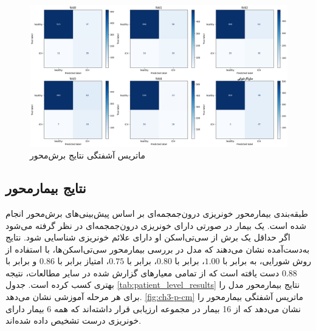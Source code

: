 \begin{figure}[h]
\centering
\includegraphics[width=1.0\linewidth]{Images/Chapter3/s-cm}
\caption{ماتریس آشفتگی نتایج برش‌محور}
\label{fig:ch3-s-cm}
\end{figure}







\subsection{نتایج بیمارمحور}

طبقه‌بندی بیمارمحور خونریزی درون‌جمجمه‌ای بر اساس پیش‌بینی‌های برش‌محور انجام شده است. یک بیمار در صورتی دارای خونریزی درون‌جمجمه‌ای در نظر گرفته می‌شود اگر حداقل یک برش از سی‌تی‌اسکن او دارای علائم خونریزی شناسایی شود. نتایج به‌دست‌آمده نشان می‌دهند که مدل 
 در بررسی بیمارمحور سی‌تی‌اسکن‌ها، با استفاده از روش شورایی، به 
  برابر با
   $1.00$، 
برابر با
     $0.80$، 
      برابر با
       $0.75$،
        امتیاز
          برابر با
           $0.86$
            و 
             برابر با
              $0.88$ 
              دست یافته است که از تمامی معیارهای گزارش شده در سایر مطالعات، نتیجه بهتری کسب کرده است.
جدول \ref{tab:patient_level_results} نتایج بیمارمحور مدل  را برای هر مرحله آموزشی نشان می‌دهد.
\autoref{fig:ch3-p-cm}
ماتریس آشفتگی بیمارمحور را نشان می‌دهد که از 16 بیمار در مجموعه ارزیابی قرار داشته‌اند که همه 6 بیمار دارای خونریزی درست تشخیص داده شده‌اند.

